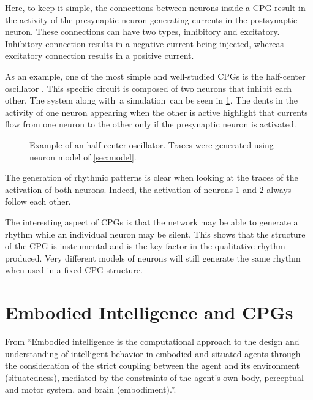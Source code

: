 Here, to keep it simple, the connections between neurons inside a CPG result in the activity of the presynaptic neuron generating currents in the postsynaptic neuron.
These connections can have two types, inhibitory and excitatory.
Inhibitory connection results in a negative current being injected, whereas excitatory connection results in a positive current.

As an example, one of the most simple and well-studied CPGs is the half-center oscillator \citep{halfcenter}.
This specific circuit is composed of two neurons that inhibit each other.
The system along with a simulation can be seen in \ref{fig:halfcenter}.
The dents in the activity of one neuron appearing when the other is active highlight that currents flow from one neuron to the other only if the presynaptic neuron is activated. 

\begin{figure}[htb]
    \centering
    \caption{Example of an half center oscillator. Traces were generated using neuron model of \cref{sec:model}.}
    \label{fig:halfcenter}
\end{figure}

The generation of rhythmic patterns is clear when looking at the traces of the activation of both neurons.
Indeed, the activation of neurons 1 and 2 always follow each other.

The interesting aspect of CPGs is that the network may be able to generate a rhythm while an individual neuron may be silent.
This shows that the structure of the CPG is instrumental and is the key factor in the qualitative rhythm produced.
Very different models of neurons will still generate the same rhythm when used in a fixed CPG structure.

\section{Embodied Intelligence and CPGs} 

From \citet{embodiedDef} \enquote{Embodied intelligence is the computational approach to the design and understanding of intelligent behavior in embodied and situated agents through the consideration of the strict coupling between the agent and its environment (situatedness), mediated by the constraints of the agent’s own body, perceptual and motor system, and brain (embodiment).}.


